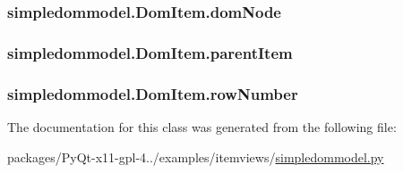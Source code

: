 \subsubsection[{dom\+Node}]{\setlength{\rightskip}{0pt plus 5cm}simpledommodel.\+Dom\+Item.\+dom\+Node}\label{classsimpledommodel_1_1DomItem_aca0e7a0395d8e737cd50673ee02366bc}
\hypertarget{classsimpledommodel_1_1DomItem_a2a0110c583f4ba8061391b88c872c927}{}
\subsubsection[{parent\+Item}]{\setlength{\rightskip}{0pt plus 5cm}simpledommodel.\+Dom\+Item.\+parent\+Item}\label{classsimpledommodel_1_1DomItem_a2a0110c583f4ba8061391b88c872c927}
\hypertarget{classsimpledommodel_1_1DomItem_ab0ca2a5683be05b5bc1871e88e3cbeef}{}
\subsubsection[{row\+Number}]{\setlength{\rightskip}{0pt plus 5cm}simpledommodel.\+Dom\+Item.\+row\+Number}\label{classsimpledommodel_1_1DomItem_ab0ca2a5683be05b5bc1871e88e3cbeef}


The documentation for this class was generated from the following file\+:\begin{DoxyCompactItemize}
\item 
packages/\+Py\+Qt-\/x11-\/gpl-\/4../examples/itemviews/\hyperlink{simpledommodel_8py}{simpledommodel.\+py}\end{DoxyCompactItemize}
